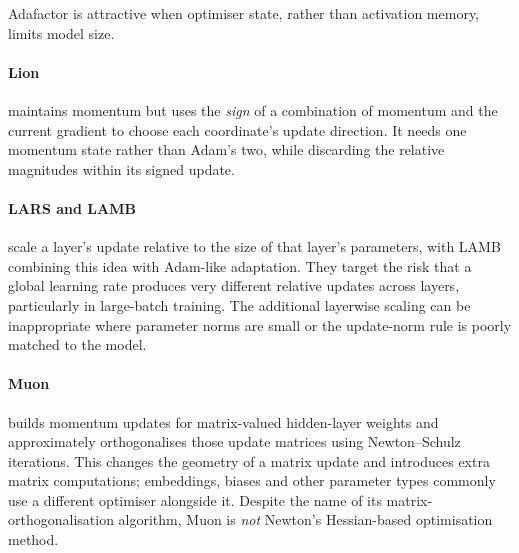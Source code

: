 \begin{calloutmemoryhook}
    Adafactor is attractive when optimiser state, rather than activation memory, limits model size.
\end{calloutmemoryhook}


\paragraph{Lion} maintains momentum but uses the \emph{sign} of a combination of momentum and the current gradient to choose each coordinate's update direction.
It needs one momentum state rather than Adam's two, while discarding the relative magnitudes within its signed update.

\paragraph{LARS and LAMB} scale a layer's update relative to the size of that layer's parameters, with LAMB combining this idea with Adam-like adaptation.
They target the risk that a global learning rate produces very different relative updates across layers, particularly in large-batch training.
The additional layerwise scaling can be inappropriate where parameter norms are small or the update-norm rule is poorly matched to the model.

\paragraph{Muon} builds momentum updates for matrix-valued hidden-layer weights and approximately orthogonalises those update matrices using Newton--Schulz iterations.
This changes the geometry of a matrix update and introduces extra matrix computations; embeddings, biases and other parameter types commonly use a different optimiser alongside it.
Despite the name of its matrix-orthogonalisation algorithm, Muon is \emph{not} Newton's Hessian-based optimisation method.


